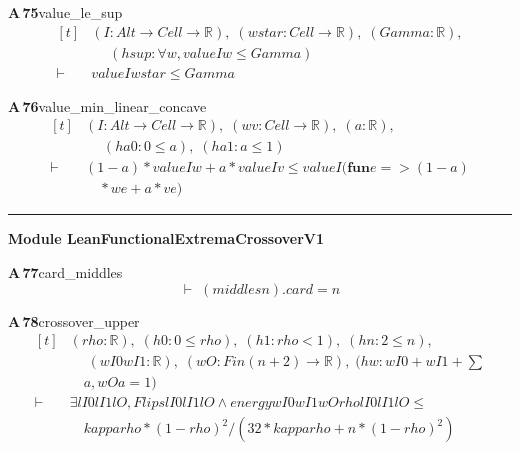 \documentclass[conference]{IEEEtran}
\theoremstyle{definition}
\newcommand{\lean}[1]{\textsf{\footnotesize #1}}
\begin{document}
\noindent\textbf{A\,75}\quad\lean{value\_le\_sup}
{\footnotesize\[ \begin{aligned}[t]
&(\mathit{I} : \mathit{Alt} \to \mathit{Cell} \to \mathbb{R} ),\; (\mathit{wstar} : \mathit{Cell} \to \mathbb{R} ),\; (\mathit{Gamma} : \mathbb{R} ),\\
&\quad \; (\mathit{hsup} : \forall \mathit{w}, \mathit{value} \mathit{I} \mathit{w} \leq \mathit{Gamma})\\
\vdash\;&\mathit{value} \mathit{I} \mathit{wstar} \leq \mathit{Gamma}
\end{aligned} \]}

\noindent\textbf{A\,76}\quad\lean{value\_min\_linear\_concave}
{\footnotesize\[ \begin{aligned}[t]
&(\mathit{I} : \mathit{Alt} \to \mathit{Cell} \to \mathbb{R} ),\; (\mathit{w} \mathit{v} : \mathit{Cell} \to \mathbb{R} ),\; (\mathit{a} : \mathbb{R} ),\\
&\quad \; (\mathit{ha0} : 0 \leq \mathit{a}),\; (\mathit{ha1} : \mathit{a} \leq 1)\\
\vdash\;&(1 - \mathit{a}) * \mathit{value} \mathit{I} \mathit{w} + \mathit{a} * \mathit{value} \mathit{I} \mathit{v} \leq \mathit{value} \mathit{I} (\mathbf{fun} \mathit{e} => (1 - \mathit{a})\\
&\quad * \mathit{w} \mathit{e} + \mathit{a} * \mathit{v} \mathit{e})
\end{aligned} \]}

\vspace{4pt}\noindent\rule{\columnwidth}{0.4pt}\par\vspace{2pt}
\noindent\textbf{Module \lean{LeanFunctionalExtremaCrossoverV1}}\par\vspace{3pt}

\noindent\textbf{A\,77}\quad\lean{card\_middles}
{\footnotesize\[ \vdash\; (\mathit{middles} \mathit{n}).\mathit{card} = \mathit{n} \]}

\noindent\textbf{A\,78}\quad\lean{crossover\_upper}
{\footnotesize\[ \begin{aligned}[t]
&(\mathit{rho} : \mathbb{R} ),\; (\mathit{h0} : 0 \leq \mathit{rho}),\; (\mathit{h1} : \mathit{rho} < 1),\; (\mathit{hn} : 2 \leq \mathit{n}),\\
&\quad \; (\mathit{wI0} \mathit{wI1} : \mathbb{R} ),\; (\mathit{wO} : \mathit{Fin} (\mathit{n}+2) \to \mathbb{R} ),\; (\mathit{hw} : \mathit{wI0} + \mathit{wI1} + \textstyle\sum\\
&\quad \mathit{a}, \mathit{wO} \mathit{a} = 1)\\
\vdash\;&\exists \mathit{lI0} \mathit{lI1} \mathit{lO}, \mathit{Flips} \mathit{lI0} \mathit{lI1} \mathit{lO} \wedge \mathit{energy} \mathit{wI0} \mathit{wI1} \mathit{wO} \mathit{rho} \mathit{lI0} \mathit{lI1} \mathit{lO} \leq\\
&\quad \mathit{kappa} \mathit{rho}*(1-\mathit{rho})^{2}/(32*\mathit{kappa} \mathit{rho} + \mathit{n}*(1-\mathit{rho})^{2})
\end{aligned} \]}
\end{document}
